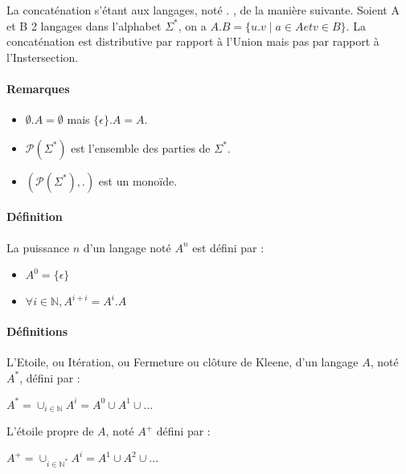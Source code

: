 La concaténation s'étant aux langages, noté . , de la manière suivante. Soient A et B 2 langages dans l'alphabet $\Sigma^*$, on a $A.B=\{u.v \mid a \in A et v \in B\}$. La concaténation est distributive par rapport à l'Union mais pas par rapport à l'Instersection. 



\paragraph{Remarques} %
\label{par:remarques}

\begin{itemize}
	\item $\emptyset.A=\emptyset$ mais $\{\epsilon\}.A=A$.
	\item $\mathcal{P}(\Sigma^*)$ est l'ensemble des parties de $\Sigma^*$.
	\item $(\mathcal{P}(\Sigma^*),.)$ est un monoïde.
\end{itemize}



\paragraph{Définition} %
\label{par:d_finition}

La puissance $n$ d'un langage noté $A^n$ est défini par :
\begin{itemize}
	\item $A^0=\{\epsilon\}$
	\item $\forall i \in \mathbb{N}, A^{i+i}=A^i.A$
\end{itemize}



\paragraph{Définitions} %
\label{par:d_finitions}

L'Etoile, ou Itération, ou Fermeture ou clôture de Kleene, d'un langage $A$, noté $A^*$, défini par :

$A^* = \cup_{i \in \mathbb{N}} A^i = A^0 \cup A^1 \cup ...$

L'étoile propre de $A$, noté $A^+$ défini par :

$A^+ = \cup_{i\in \mathbb{N^*}} A^i = A^1 \cup A^2 \cup ...$



